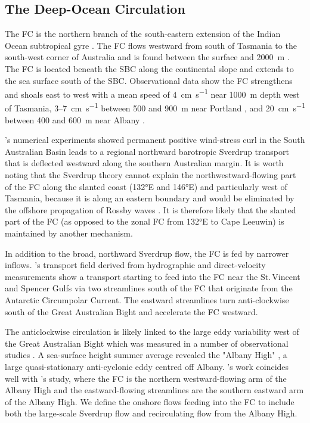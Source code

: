 \documentclass[preprint,3p,review,12pt]{elsarticle}
\newcommand{\citepos}[1]{\citeauthor{#1}'s \citeyearpar{#1}}
\begin{document}
\subsection{The Deep-Ocean Circulation} \label{The Deep-Ocean Circulation}
The FC is the northern branch of the south-eastern extension of the Indian Ocean subtropical gyre \citep{Hufford1997, McCartney2007}. The FC flows westward from south of Tasmania to the south-west corner of Australia and is found between the surface and \SI{2000}{\meter} \citep{Middleton2002}. The FC is located beneath the SBC along the continental slope and extends to the sea surface south of the SBC\@.
Observational data show the FC strengthens and shoals east to west with a mean speed of \SI{4}{\centi\meter\per\second} near \SI{1000}{\meter} depth west of Tasmania, \num{3}--\SI{7}{\centi\meter\per\second} between \num{500} and \SI{900}{\meter} near Portland \citep{Middleton2007}, and \SI{20}{\centi\meter\per\second} between \num{400} and \SI{600}{\meter} near Albany \citep{Cresswell1993}.

\citepos{Middleton2002} numerical experiments showed permanent positive wind-stress curl in the South Australian Basin leads to a regional northward barotropic Sverdrup transport that is deflected westward along the southern Australian margin. It is worth noting that the Sverdrup theory cannot explain the northwestward-flowing part of the FC along the slanted coast (\ang{132}E and \ang{146}E) and particularly west of Tasmania, because it is along an eastern boundary \citep{McCreary1981,McCreary1991} and would be eliminated by the offshore propagation of Rossby waves \citep{Anderson1975}. It is therefore likely that the slanted part of the FC (as opposed to the zonal FC from \ang{132}E to Cape Leeuwin) is maintained by another mechanism.

In addition to the broad, northward Sverdrup flow, the FC is fed by narrower inflows. \citepos{McCartney2007} transport field derived from hydrographic and direct-velocity measurements show a transport starting to feed into the FC near the St.\,Vincent and Spencer Gulfs via two streamlines south of the FC that originate from the Antarctic Circumpolar Current. The eastward streamlines turn anti-clockwise south of the Great Australian Bight and accelerate the FC westward\@.

The anticlockwise circulation is likely linked to the large eddy variability west of the Great Australian Bight which was measured in a number of observational studies \citep{Cresswell1993,Godfrey1986,Ridgway2004}. A sea-surface height summer average \citep{Middleton2003} revealed the "Albany High" \citep{Middleton2007}, a large quasi-stationary anti-cyclonic eddy centred off Albany. \citepos{McCartney2007} work coincides well
with \citepos{Middleton2007} study, where the FC is the northern westward-flowing arm of the Albany High and the eastward-flowing streamlines are the southern eastward arm of the Albany High. We define the onshore flows
feeding into the FC to include both the large-scale Sverdrup flow and recirculating flow from the Albany High.
\end{document}
